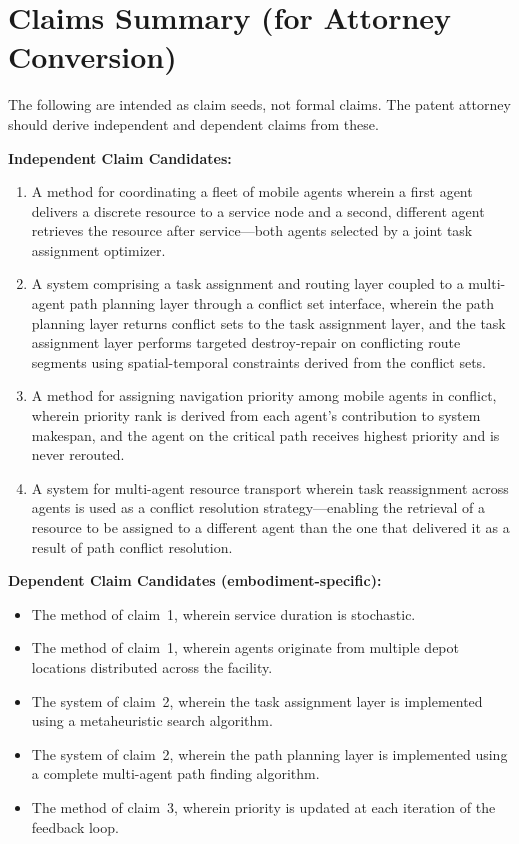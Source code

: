 \documentclass[12pt]{article}
\begin{document}
\section{Claims Summary (for Attorney Conversion)}

The following are intended as claim seeds, not formal claims. The patent attorney should derive independent and dependent claims from these.

\medskip
\noindent\textbf{Independent Claim Candidates:}

\begin{enumerate}[leftmargin=2em]
    \item A method for coordinating a fleet of mobile agents wherein a first agent delivers a discrete resource to a service node and a second, different agent retrieves the resource after service---both agents selected by a joint task assignment optimizer.

    \item A system comprising a task assignment and routing layer coupled to a multi-agent path planning layer through a conflict set interface, wherein the path planning layer returns conflict sets to the task assignment layer, and the task assignment layer performs targeted destroy-repair on conflicting route segments using spatial-temporal constraints derived from the conflict sets.

    \item A method for assigning navigation priority among mobile agents in conflict, wherein priority rank is derived from each agent's contribution to system makespan, and the agent on the critical path receives highest priority and is never rerouted.

    \item A system for multi-agent resource transport wherein task reassignment across agents is used as a conflict resolution strategy---enabling the retrieval of a resource to be assigned to a different agent than the one that delivered it as a result of path conflict resolution.
\end{enumerate}

\medskip
\noindent\textbf{Dependent Claim Candidates (embodiment-specific):}

\begin{itemize}[leftmargin=2em]
    \item The method of claim~1, wherein service duration is stochastic.
    \item The method of claim~1, wherein agents originate from multiple depot locations distributed across the facility.
    \item The system of claim~2, wherein the task assignment layer is implemented using a metaheuristic search algorithm.
    \item The system of claim~2, wherein the path planning layer is implemented using a complete multi-agent path finding algorithm.
    \item The method of claim~3, wherein priority is updated at each iteration of the feedback loop.
\end{itemize}
\end{document}
